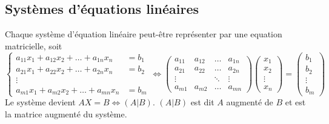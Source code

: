 \subsection{Systèmes d'équations linéaires}
\begin{definition}
    Chaque système d'équation linéaire peut-être représenter par une equation matricielle, soit
    \[
        \begin{cases}
            a_{11}x_1 + a_{12}x_2 + \ldots + a_{1n}x_n & = b_1 \\
            a_{21}x_1 + a_{22}x_2 + \ldots + a_{2n}x_n & = b_2 \\
            \vdots                                             \\
            a_{m1}x_1 + a_{m2}x_2 + \ldots + a_{mn}x_n & = b_m
        \end{cases} \iff \begin{pmatrix}
            a_{11} & a_{12}      & \dots  & a_{1n} \\
            a_{21} & a_{22}      & \dots  & a_{2n} \\
            \vdots & \phantom{a} & \ddots & \vdots \\
            a_{m1} & a_{m2}      & \dots  & a_{mn}
        \end{pmatrix} \begin{pmatrix}
            x_1    \\
            x_2    \\
            \vdots \\
            x_n
        \end{pmatrix} = \begin{pmatrix}
            b_1    \\
            b_2    \\
            \vdots \\
            b_m
        \end{pmatrix}
    \]
    Le système devient $AX = B \iff (A|B)$. $(A|B)$ est dit $A$ augmenté de $B$ et est la matrice augmenté du système.
\end{definition}

